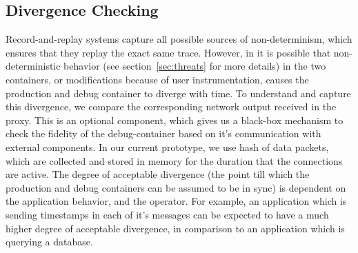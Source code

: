 
\subsection{Divergence Checking}
\label{sec:divergenceChecking}

Record-and-replay systems capture all possible sources of non-determinism, which ensures that they replay the exact same trace. 
However, in \parikshan it is possible that non-deterministic behavior (see section~\ref{sec:threats} for more details) in the two containers, or modifications because of user instrumentation, causes the production and debug container to diverge with time.
To understand and capture this divergence, we compare the corresponding network output received in the proxy.
This is an optional component, which gives us a black-box mechanism to check the fidelity of the debug-container based on it's communication with external components.
In our current prototype, we use hash of data packets, which are collected and stored in memory for the duration that the connections are active.
The degree of acceptable divergence (the point till which the production and debug containers can be assumed to be in sync) is dependent on the application behavior, and the operator. 
For example, an application which is sending timestamps in each of it's messages can be expected to have a much higher degree of acceptable divergence, in comparison to an application which is querying a database.